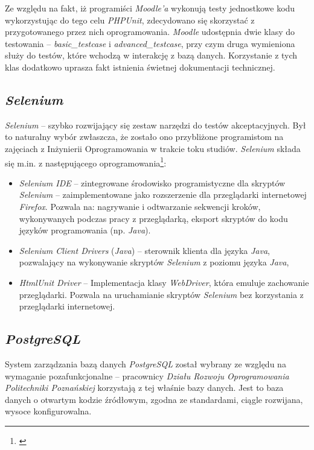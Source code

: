 Ze względu na fakt, iż programiści \textit{Moodle'a} wykonują testy jednostkowe kodu wykorzystując do tego celu \textit{PHPUnit}, zdecydowano się skorzystać z przygotowanego przez nich oprogramowania. \textit{Moodle} udostępnia dwie klasy do testowania -- \textit{basic\_testcase} i \textit{advanced\_testcase}, przy czym druga wymieniona służy do testów, które wchodzą w interakcję z bazą danych. Korzystanie z tych klas dodatkowo uprasza fakt istnienia świetnej dokumentacji technicznej\cite{Man:PHPUnit}.

\subsection{\textit{Selenium}}
\label{Chapter634}

\textit{Selenium} -- szybko rozwijający się zestaw narzędzi do testów akceptacyjnych. Był to naturalny wybór zwłaszcza, że zostało ono przybliżone programistom na zajęciach z Inżynierii Oprogramowania w trakcie toku studiów. \textit{Selenium} składa się m.in. z następującego oprogramowania\footnote{\cite{Man:Selenium}}:
\begin{itemize}
\item{\textit{Selenium IDE} -- zintegrowane środowisko programistyczne dla skryptów \textit{Selenium} -- zaimplementowane jako rozszerzenie dla przeglądarki internetowej \textit{Firefox}. Pozwala na: nagrywanie i odtwarzanie sekwencji kroków, wykonywanych podczas pracy z przeglądarką, eksport skryptów do kodu języków programowania (np. \textit{Java}).}
\item{\textit{Selenium Client Drivers} (\textit{Java}) -- sterownik klienta dla języka \textit{Java}, pozwalający na wykonywanie skryptów \textit{Selenium} z poziomu języka \textit{Java}},
\item{\textit{HtmlUnit Driver} -- Implementacja klasy \textit{WebDriver}, która emuluje zachowanie przeglądarki. Pozwala na uruchamianie skryptów \textit{Selenium} bez korzystania z przeglądarki internetowej.}
\end{itemize}

\subsection{\textit{PostgreSQL}}
\label{Chapter635}

System zarządzania bazą danych \textit{PostgreSQL} został wybrany ze względu na wymaganie pozafunkcjonalne -- pracownicy \textit{Działu Rozwoju Oprogramowania Politechniki Poznańskiej} korzystają z tej właśnie bazy danych. Jest to baza danych o otwartym kodzie źródłowym, zgodna ze standardami, ciągle rozwijana, wysoce konfigurowalna.

